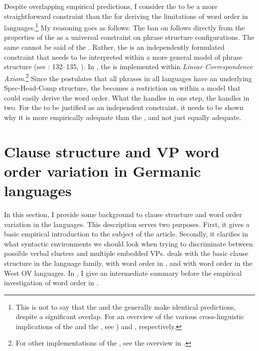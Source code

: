 \documentclass[output=paper, colorlinks, citecolor=brown]{langscibook}
\begin{document}
Despite overlapping empirical predictions, I consider the  to be a more straightforward constraint than the  for deriving the limitations of  word order in  languages.\footnote{This is not to say that the  and the  generally make identical predictions, despite a significant overlap. For an overview of the various cross-linguistic implications of the  and the , see \citealt[10–17, 65–94]{Haider2013}) and \citet[173–205]{BiberauerEtAl2014}, respectively.} My reasoning goes as follows: The ban on  follows directly from the properties of the  as a universal constraint on phrase structure configurations. The same cannot be said of the . Rather, the  is an independently formulated constraint that needs to be interpreted within a more general model of phrase structure (see \citealt{Haider2013}: 132–135, \citealt[205–215]{BiberauerEtAl2014}). In \citet{BiberauerEtAl2014}, the  is implemented within  \textit{Linear Correspondence Axiom}.\footnote{For other implementations of the , see the overview in \citet{Holmberg2017}.}  Since the  postulates that all phrases in all languages have an underlying Spec-Head-Comp structure, the  becomes a restriction on  within a model that could easily derive the  word order. What the  handles in one step, the  handles in two. For the  to be justified as an independent constraint, it needs to be shown why it is more empirically adequate than the , and not just equally adequate.


\section{Clause structure and VP word order variation in Germanic languages}\label{sec:sangfelt:3}

In this section, I provide some background to clause structure and  word order variation in the  languages. This description serves two purposes. First, it gives a basic empirical introduction to the subject of the article. Secondly, it clarifies in what syntactic environments we should look when trying to discriminate between possible verbal clusters and multiple embedded VPs.  deals with the basic clause structure in the  language family,  with  word order in , and  with  word order in the West  OV languages. In , I give an intermediate summary before the empirical investigation of  word order in .
\end{document}
